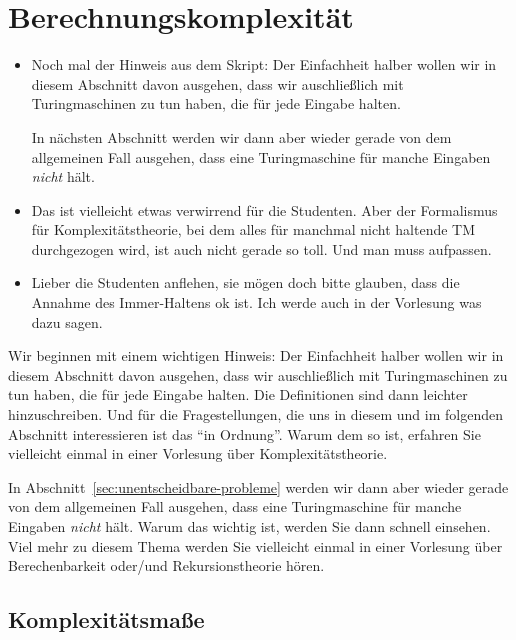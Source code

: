 \Tut\section{Berechnungskomplexit\"at}
\label{sec:komplexitaet}

\begin{tutorium}
  \begin{itemize}
  \item Noch mal der Hinweis aus dem Skript: Der Einfachheit halber
    wollen wir in diesem Abschnitt davon ausgehen, dass wir
    auschließlich mit Turingmaschinen zu tun haben, die für jede
    Eingabe halten.

    In nächsten Abschnitt werden wir dann aber wieder gerade von dem
    allgemeinen Fall ausgehen, dass eine Turingmaschine für manche
    Eingaben \emph{nicht} hält.
  \item Das ist vielleicht etwas verwirrend für die Studenten. Aber
    der Formalismus für Komplexitätstheorie, bei dem alles für
    manchmal nicht haltende TM durchgezogen wird, ist auch nicht
    gerade so toll. Und man muss aufpassen.
  \item Lieber die Studenten anflehen, sie mögen doch bitte glauben,
    dass die Annahme des Immer-Haltens ok ist. Ich werde auch in der
    Vorlesung was dazu sagen.
  \end{itemize}
\end{tutorium}


Wir beginnen mit einem wichtigen Hinweis: Der Einfachheit halber
wollen wir in diesem Abschnitt davon ausgehen, dass wir
auschließlich mit Turingmaschinen zu tun haben, die für jede Eingabe
halten. Die Definitionen sind dann leichter hinzuschreiben. Und für
die Fragestellungen, die uns in diesem und im folgenden Abschnitt
interessieren ist das "`in Ordnung"'. Warum dem so ist, erfahren Sie
vielleicht einmal in einer Vorlesung über Komplexitätstheorie.

In Abschnitt~\ref{sec:unentscheidbare-probleme} werden wir dann aber
wieder gerade von dem allgemeinen Fall ausgehen, dass eine
Turingmaschine für manche Eingaben \emph{nicht} hält. Warum das
wichtig ist, werden Sie dann schnell einsehen. Viel mehr zu diesem
Thema werden Sie vielleicht einmal in einer Vorlesung über
Berechenbarkeit oder/und Rekursionstheorie hören.

\Tut\subsection{Komplexit\"atsma\ss e}
\label{subsec:kompl-masze}

